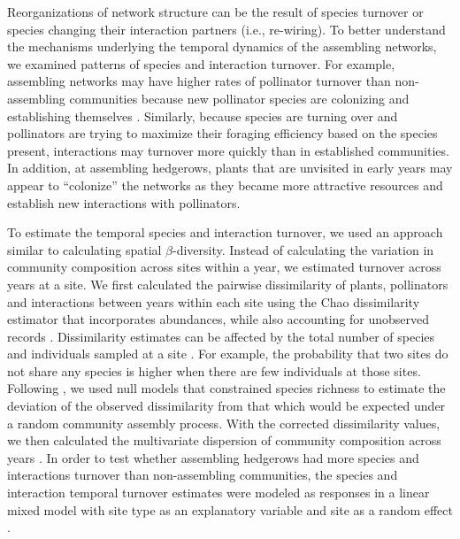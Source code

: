 \documentclass[12pt]{article}
\begin{document}
Reorganizations of network structure can be the result of species
turnover or species changing their interaction partners (i.e.,
re-wiring). To better understand the mechanisms underlying the
temporal dynamics of the assembling networks, we examined patterns of
species and interaction turnover. For example, assembling networks may
have higher rates of pollinator turnover than non-assembling
communities because new pollinator species are colonizing and
establishing themselves \citep{mgonigle-2015-x}. Similarly, because
species are turning over and pollinators are trying to maximize their
foraging efficiency based on the species present, interactions may
turnover more quickly than in established communities. In addition, at
assembling hedgerows, plants that are unvisited in early years may
appear to ``colonize'' the networks as they became more attractive
resources and establish new interactions with pollinators.

To estimate the temporal species and interaction turnover, we used an
approach similar to calculating spatial $\beta$-diversity. Instead of
calculating the variation in community composition across sites within
a year, we estimated turnover across years at a site. We first
calculated the pairwise dissimilarity of plants, pollinators and
interactions between years within each site using the Chao
dissimilarity estimator that incorporates abundances, while also
accounting for unobserved records \citep{chao-2005-148}. Dissimilarity
estimates can be affected by the total number of species and
individuals sampled at a site \citep[e.g.,][]{ponisio2015farm}. For
example, the probability that two sites do not share any species is
higher when there are few individuals at those sites. Following
\cite{ponisio2015farm}, we used null models that constrained species
richness to estimate the deviation of the observed dissimilarity from
that which would be expected under a random community assembly
process. With the corrected dissimilarity values, we then calculated
the multivariate dispersion of community composition across years
\citep{anderson-2011-19}. In order to test whether assembling
hedgerows had more species and interactions turnover than
non-assembling communities, the species and interaction temporal
turnover estimates were modeled as responses in a linear mixed model
with site type as an explanatory variable and site as a random effect
\citep{lme4, lmetest}.
\end{document}
